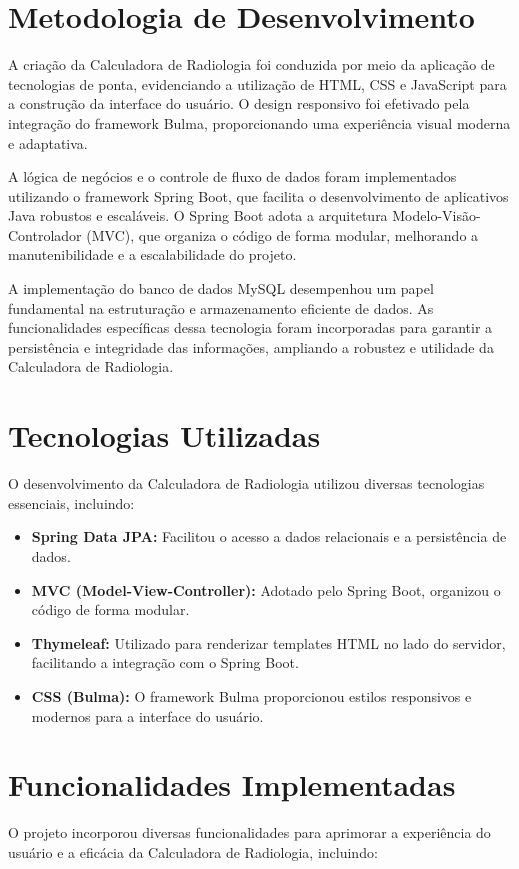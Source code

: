\documentclass[conference]{IEEEtran}
\begin{document}
\section{Metodologia de Desenvolvimento}
A criação da Calculadora de Radiologia foi conduzida por meio da aplicação de tecnologias de ponta, evidenciando a utilização de HTML, CSS e JavaScript para a construção da interface do usuário. O design responsivo foi efetivado pela integração do framework Bulma, proporcionando uma experiência visual moderna e adaptativa.

A lógica de negócios e o controle de fluxo de dados foram implementados utilizando o framework Spring Boot, que facilita o desenvolvimento de aplicativos Java robustos e escaláveis. O Spring Boot adota a arquitetura Modelo-Visão-Controlador (MVC), que organiza o código de forma modular, melhorando a manutenibilidade e a escalabilidade do projeto.

A implementação do banco de dados MySQL desempenhou um papel fundamental na estruturação e armazenamento eficiente de dados. As funcionalidades específicas dessa tecnologia foram incorporadas para garantir a persistência e integridade das informações, ampliando a robustez e utilidade da Calculadora de Radiologia.

\section{Tecnologias Utilizadas}
O desenvolvimento da Calculadora de Radiologia utilizou diversas tecnologias essenciais, incluindo:

\begin{itemize}
  \item \textbf{Spring Data JPA:} Facilitou o acesso a dados relacionais e a persistência de dados.
  \item \textbf{MVC (Model-View-Controller):} Adotado pelo Spring Boot, organizou o código de forma modular.
  \item \textbf{Thymeleaf:} Utilizado para renderizar templates HTML no lado do servidor, facilitando a integração com o Spring Boot.
  \item \textbf{CSS (Bulma):} O framework Bulma proporcionou estilos responsivos e modernos para a interface do usuário.
\end{itemize}

\section{Funcionalidades Implementadas}
O projeto incorporou diversas funcionalidades para aprimorar a experiência do usuário e a eficácia da Calculadora de Radiologia, incluindo:
\end{document}
